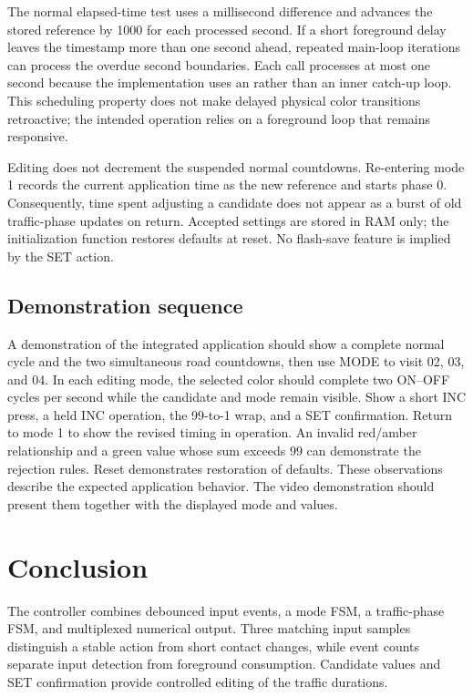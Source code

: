 \documentclass[a4paper]{article}
\newcommand{\code}[1]{\texttt{\detokenize{#1}}}
\newcommand{\topic}[1]{\subsection{#1}}
\begin{document}
The normal elapsed-time test uses a millisecond difference and advances the
stored reference by 1000 for each processed second. If a short foreground
delay leaves the timestamp more than one second ahead, repeated main-loop
iterations can process the overdue second boundaries. Each call processes
at most one second because the implementation uses an \code{if} rather
than an inner catch-up loop. This scheduling property does not make delayed
physical color transitions retroactive; the intended operation relies on a
foreground loop that remains responsive.

Editing does not decrement the suspended normal countdowns. Re-entering mode 1
records the current application time as the new reference and starts phase 0.
Consequently, time spent adjusting a candidate does not appear as a burst of
old traffic-phase updates on return. Accepted settings are stored in RAM only;
the initialization function restores defaults at reset. No flash-save feature
is implied by the SET action.


\topic{Demonstration sequence}
A demonstration of the integrated application should show a complete normal
cycle and the two simultaneous road countdowns, then use MODE to visit 02,
03, and 04. In each editing mode, the selected color should complete two
ON--OFF cycles per second while the candidate and mode remain visible.
Show a short INC press, a held INC operation, the 99-to-1 wrap, and a SET
confirmation. Return to mode 1 to show the revised timing in operation.
An invalid red/amber relationship and a green value whose sum exceeds 99
can demonstrate the rejection rules. Reset demonstrates restoration of defaults.
These observations describe the expected application behavior. The video
demonstration should present them together with the displayed mode and values.

\section*{Conclusion}
The controller combines debounced input events, a mode FSM, a traffic-phase
FSM, and multiplexed numerical output. Three matching input samples distinguish
a stable action from short contact changes, while event counts separate input
detection from foreground consumption. Candidate values and SET confirmation
provide controlled editing of the traffic durations.
\end{document}
